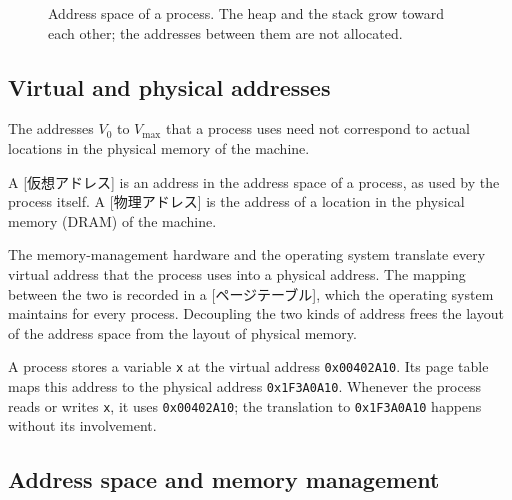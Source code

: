 \documentclass[../main.tex]{subfiles}
\begin{document}
\begin{figure}[htbp]
  \centering
  
  \caption{Address space of a process.  The heap and the stack grow toward
    each other; the addresses between them are not allocated.}
  \label{fig:l02-address-space}
\end{figure}

\subsection{Virtual and physical addresses}

The addresses $V_0$ to $V_{\max}$ that a process uses need not correspond to
actual locations in the physical memory of the machine.

\begin{definition}
  A [仮想アドレス] is an address in the address space
  of a process, as used by the process itself.  A
  [物理アドレス] is the address of a location in the
  physical memory (DRAM) of the machine.
\end{definition}

The memory-management hardware and the operating system translate every
virtual address that the process uses into a physical address.  The mapping
between the two is recorded in a [ページテーブル], which
the operating system maintains for every process.  Decoupling the two kinds
of address frees the layout of the address space from the layout of
physical memory.

\begin{example}
  A process stores a variable \texttt{x} at the virtual address
  \texttt{0x00402A10}.  Its page table maps this address to the physical
  address \texttt{0x1F3A0A10}.  Whenever the process reads or writes
  \texttt{x}, it uses \texttt{0x00402A10}; the translation to
  \texttt{0x1F3A0A10} happens without its involvement.
\end{example}

\subsection{Address space and memory management}
\end{document}

